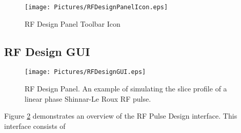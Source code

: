 \documentclass{book}%
\begin{document}
\begin{figure}[htbp]
	\centering
		\texttt{[image: Pictures/RFDesignPanelIcon.eps]}
	\caption{RF Design Panel Toolbar Icon}
	\label{fig:RFDesignPanelIcon}
\end{figure}

\subsection{RF Design GUI}

\begin{figure}[htbp]
	\centering
		\texttt{[image: Pictures/RFDesignGUI.eps]}
	\caption{RF Design Panel. An example of simulating the slice profile of a linear phase Shinnar-Le Roux RF pulse.}
	\label{fig:RFDesignGUI}
\end{figure}

Figure \ref{fig:RFDesignGUI} demonstrates an overview of the RF Pulse Design interface. This interface consists of 
\end{document}
